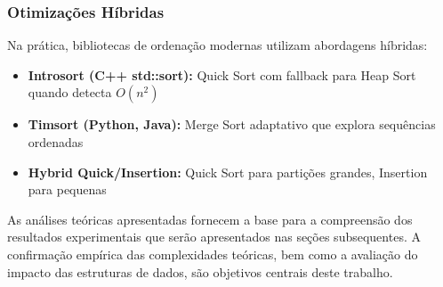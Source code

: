 \documentclass[conference]{IEEEtran}
\begin{document}
\subsubsection{Otimizações Híbridas}

Na prática, bibliotecas de ordenação modernas utilizam abordagens híbridas:

\begin{itemize}
    \item \textbf{Introsort (C++ std::sort):} Quick Sort com fallback para Heap Sort quando detecta $O(n^2)$
    \item \textbf{Timsort (Python, Java):} Merge Sort adaptativo que explora sequências ordenadas
    \item \textbf{Hybrid Quick/Insertion:} Quick Sort para partições grandes, Insertion para pequenas
\end{itemize}


As análises teóricas apresentadas fornecem a base para a compreensão dos resultados experimentais que serão apresentados nas seções subsequentes. A confirmação empírica das complexidades teóricas, bem como a avaliação do impacto das estruturas de dados, são objetivos centrais deste trabalho.
\end{document}
